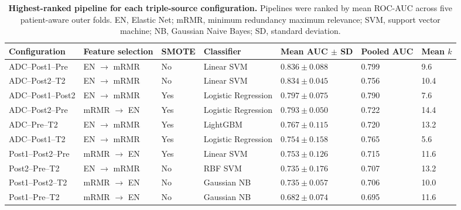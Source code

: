 \documentclass[12pt,twocolumn]{article}
\begin{document}
\begin{table}[htbp]
\centering
\caption{\textbf{Highest-ranked pipeline for each triple-source
configuration.} Pipelines were ranked by mean ROC-AUC across five
patient-aware outer folds. EN, Elastic Net; mRMR, minimum redundancy
maximum relevance; SVM, support vector machine; NB, Gaussian Naive
Bayes; SD, standard deviation.}
\label{tab:triple_source_results}
\scriptsize

\begin{tabularx}{\textwidth}{
    p{2.5cm}
    p{2.6cm}
    p{1.1cm}
    p{2.3cm}
    p{2.4cm}
    p{1.8cm}
    X
}
\toprule
\textbf{Configuration} &
\textbf{Feature selection} &
\textbf{SMOTE} &
\textbf{Classifier} &
\textbf{Mean AUC \(\pm\) SD} &
\textbf{Pooled AUC} &
\textbf{Mean \(k\)} \\
\midrule

ADC--Post1--Pre &
EN \(\rightarrow\) mRMR &
No &
Linear SVM &
\(\mathbf{0.836 \pm 0.088}\) &
\(\mathbf{0.799}\) &
9.6 \\

ADC--Post2--T2 &
EN \(\rightarrow\) mRMR &
No &
Linear SVM &
\(0.834 \pm 0.045\) &
0.756 &
10.4 \\

ADC--Post1--Post2 &
EN \(\rightarrow\) mRMR &
Yes &
Logistic Regression &
\(0.797 \pm 0.075\) &
0.790 &
7.6 \\

ADC--Post2--Pre &
mRMR \(\rightarrow\) EN &
Yes &
Logistic Regression &
\(0.793 \pm 0.050\) &
0.722 &
14.4 \\

ADC--Pre--T2 &
EN \(\rightarrow\) mRMR &
Yes &
LightGBM &
\(0.767 \pm 0.115\) &
0.720 &
13.2 \\

ADC--Post1--T2 &
EN \(\rightarrow\) mRMR &
Yes &
Logistic Regression &
\(0.754 \pm 0.158\) &
0.765 &
5.6 \\

Post1--Post2--Pre &
mRMR \(\rightarrow\) EN &
Yes &
Linear SVM &
\(0.753 \pm 0.126\) &
0.715 &
11.6 \\

Post2--Pre--T2 &
EN \(\rightarrow\) mRMR &
No &
RBF SVM &
\(0.735 \pm 0.176\) &
0.707 &
13.2 \\

Post1--Post2--T2 &
mRMR \(\rightarrow\) EN &
No &
Gaussian NB &
\(0.735 \pm 0.057\) &
0.706 &
10.0 \\

Post1--Pre--T2 &
mRMR \(\rightarrow\) EN &
No &
Gaussian NB &
\(0.682 \pm 0.074\) &
0.695 &
11.6 \\

\bottomrule
\end{tabularx}
\end{table}
\end{document}
